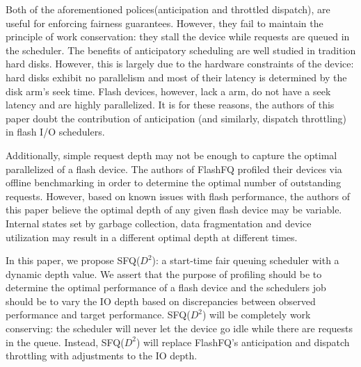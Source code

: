 Both of the aforementioned polices(anticipation and throttled
dispatch), are useful for enforcing fairness guarantees. However, they
fail to maintain the principle of work conservation: they stall the
device while requests are queued in the scheduler. The benefits of
anticipatory scheduling are well studied in tradition hard
disks. However, this is largely due to the hardware constraints of the
device: hard disks exhibit no parallelism and most of their latency is
determined by the disk arm's seek time. Flash devices, however, lack a
arm, do not have a seek latency and are highly parallelized. It is for
these reasons, the authors of this paper doubt the contribution of
anticipation (and similarly, dispatch throttling) in flash I/O schedulers.

Additionally, simple request depth may not be enough to capture the
optimal parallelized of a flash device. The authors of FlashFQ
profiled their devices via offline benchmarking in order to determine
the optimal number of outstanding requests. However, based on known
issues with flash performance, the authors of this paper believe the
optimal depth of any given flash device may be variable. Internal
states set by garbage collection, data fragmentation and device
utilization may result in a different optimal depth at different
times.  

In this paper, we propose SFQ($D^2$): a start-time fair queuing
scheduler with a dynamic depth value.  We assert that the purpose of
profiling should be to determine the optimal performance of a flash
device and the schedulers job should be to vary the IO depth based on
discrepancies between observed performance and target
performance. SFQ($D^2$) will be completely work conserving: the
scheduler will never let the device go idle while there are requests
in the queue.  Instead, SFQ($D^2$) will replace FlashFQ's anticipation
and dispatch throttling with adjustments to the IO depth.
